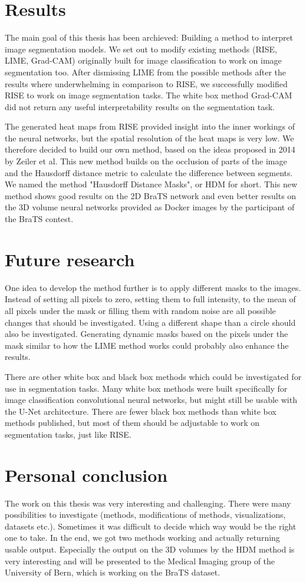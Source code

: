 \section{Results}
The main goal of this thesis has been archieved: Building a method to interpret image segmentation models. We set out to modify existing methods (RISE, LIME, Grad-CAM) originally built for image classification to work on image segmentation too. After dismissing LIME from the possible methods after the results where underwhelming in comparison to RISE, we successfully modified RISE to work on image segmentation tasks. The white box method Grad-CAM did not return any useful interpretability results on the segmentation task.

The generated heat maps from RISE provided insight into the inner workings of the neural networks, but the spatial resolution of the heat maps is very low. We therefore decided to build our own method, based on the ideas proposed in 2014 by Zeiler et al. This new method builds on the occlusion of parts of the image and the Hausdorff distance metric to calculate the difference between segments. We named the method "Hausdorff Distance Masks", or HDM for short. This new method shows good results on the 2D BraTS network and even better results on the 3D volume neural networks provided as Docker images by the participant of the BraTS contest.

\section{Future research}
One idea to develop the method further is to apply different masks to the images. Instead of setting all pixels to zero, setting them to full intensity, to the mean of all pixels under the mask or filling them with random noise are all possible changes that should be investigated. Using a different shape than a circle should also be investigated. Generating dynamic masks based on the pixels under the mask similar to how the LIME method works could probably also enhance the results.

There are other white box and black box methods which could be investigated for use in segmentation tasks. Many white box methods were built specifically for image classification convolutional neural networks, but might still be usable with the U-Net architecture. There are fewer black box methods than white box methods published, but most of them should be adjustable to work on segmentation tasks, just like RISE.

\section{Personal conclusion}
The work on this thesis was very interesting and challenging. There were many possibilities to investigate (methods, modifications of methods, visualizations, datasets etc.). Sometimes it was difficult to decide which way would be the right one to take. In the end, we got two methods working and actually returning usable output. Especially the output on the 3D volumes by the HDM method is very interesting and will be presented to the Medical Imaging group of the University of Bern, which is working on the BraTS dataset.
